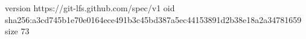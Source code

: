 version https://git-lfs.github.com/spec/v1
oid sha256:a3cd745b1e70e0164ece491b3c45bd387a5ec44153891d2b38e18a2a34781659
size 73
